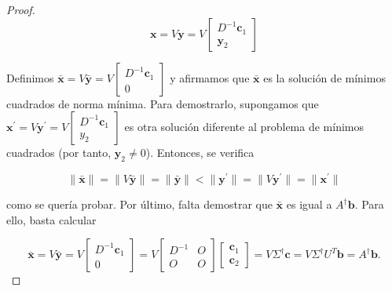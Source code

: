 \begin{proof}
    \[
        \mathbf{x} = V \mathbf{y} = V \begin{bmatrix} D^{-1} \mathbf{c}_1 \\ \mathbf{y}_2 \end{bmatrix}
    \]

    Definimos $\bar{\mathbf{x}} = V \bar{\mathbf{y}} = V \begin{bmatrix} D^{-1} \mathbf{c}_1 \\ 0 \end{bmatrix}$ y afirmamos que $\bar{\mathbf{x}}$ es la solución de mínimos cuadrados de norma mínima. Para demostrarlo, supongamos que $\mathbf{x}^{\prime}=V\mathbf{y}^{\prime} = V \begin{bmatrix} D^{-1} \mathbf{c}_1 \\ y_2 \end{bmatrix}$ es otra solución diferente al problema de mínimos cuadrados (por tanto, $\mathbf{y}_2 \neq 0$). Entonces, se verifica

    \[ \| \bar{\mathbf{x}} \| = \| V\bar{\mathbf{y}} \| = \| \bar{\mathbf{y}} \| < \| {\mathbf{y}^{\prime}} \| = \| V\mathbf{y}^{\prime} \| = \| \mathbf{x}^{\prime} \|\]

    como se quería probar. Por último, falta demostrar que $\bar{\mathbf{x}}$ es igual a $A^{\dagger}\mathbf{b}$. Para ello, basta calcular

    \[ \bar{\mathbf{x}} = V\bar{\mathbf{y}} = V \begin{bmatrix} D^{-1} \mathbf{c}_1 \\ 0 \end{bmatrix} = V \begin{bmatrix} D^{-1} & O \\ O & O \end{bmatrix} \begin{bmatrix} \mathbf{c}_1 \\ \mathbf{c}_2 \end{bmatrix} = V \Sigma^{\dagger} \mathbf{c} = V \Sigma^{\dagger} U^{T} \mathbf{b} = A^{\dagger}\mathbf{b}.\]

    
\end{proof}


\endinput